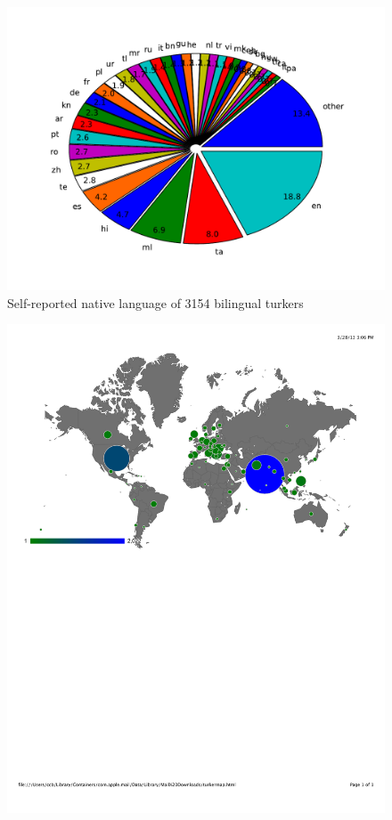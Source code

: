 \documentclass[11pt]{article}
\begin{document}
\begin{figure}[h]
\centering
\includegraphics[width=7in]{figures/natlang-pie}
\caption{Self-reported native language of 3154 bilingual turkers}
\label{lang-pie}
\end{figure}

\begin{figure}[h]
\centering
\includegraphics[width=7in]{figures/turkermap}
\caption{}
\label{map}
\end{figure}
\end{document}
